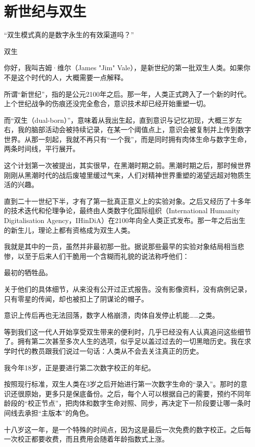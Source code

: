 \chapter{新世纪与双生}

“双生模式真的是数字永生的有效渠道吗？”

双生

你好，我叫吉姆·维尔（James "Jim" Vale），是新世纪的第一批双生人类。如果你不是这个时代的人，大概需要一点解释。

所谓“新世纪”，指的是公元2100年之后。那一年，人类正式跨入了一个新的时代。上个世纪战争的伤痕还没完全愈合，意识技术却已经开始重塑一切。

而“双生（dual-born）”，意味着从我出生起，直到意识与记忆初现，大概三岁左右，我的脑部活动会被持续记录，在某一个阈值点上，意识会被复制并上传到数字世界。从那一刻起，我就不再只有“一个我”，而是同时拥有肉体生命与数字生命，两条时间线，平行展开。

这个计划第一次被提出，其实很早，在黑潮时期之前。黑潮时期之后，那时候世界刚刚从黑潮时代的战后废墟里缓过气来，人们对精神世界重塑的渴望远超对物质生活的兴趣。

直到二十一世纪下半，才有了第一批真正意义上的实验对象。之后又经历了十多年的技术迭代和伦理争论，最终由人类数字化国际组织（International Humanity Digitalisation Agency，IHinDiA）在2100年向全人类正式发布。那一年之后出生的新生儿，理论上都有资格成为双生人类。

我就是其中的一员，虽然并非最初那一批。据说那些最早的实验对象结局相当悲惨，以至于后来人们干脆用一个含糊而礼貌的说法称呼他们：

最初的牺牲品。

关于他们的具体细节，从来没有公开过正式报告。没有影像资料，没有病例记录，只有零星的传闻，却也被扣上了阴谋论的帽子。

意识上传后再也无法回落，数字人格崩溃，肉体自发停止机能……之类。

等到我们这一代人开始享受双生带来的便利时，几乎已经没有人认真追问这些细节了。拥有第二次甚至多次人生的选项，似乎足以盖过过去的一切黑暗历史。我在求学时代的教员跟我们说过一句话：人类从不会去关注真正的历史。

我今年18岁，正是要进行第二次数字校正的年纪。

按照现行标准，双生人类在3岁之后开始进行第一次数字生命的“录入”。那时的意识还很原始，更多只是保底备份。之后，每个人可以根据自己的需要，预约不同年龄段的“校正节点”，把肉体和数字生命对照、同步，再决定下一阶段要让哪一条时间线去承担“主版本”的角色。

十八岁这一年，是一个特殊的时间点，因为这是最后一次免费的数字校正。之后每一次校正都要收费，而且费用会随着年龄指数式上涨。

